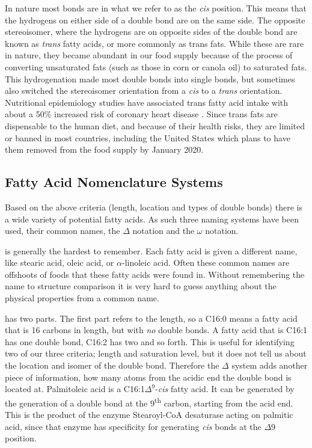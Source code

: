 \documentclass{tufte-handout}
\begin{document}
  In nature most bonds are in what we refer to as the \textit{cis} position.  This means that the hydrogens on either side of a double bond are on the same side.  The opposite stereoisomer, where the hydrogens are on opposite sides of the double bond are known as \textit{trans} fatty acids, or more commonly as trans fats.  While these are rare in nature, they became abundant in our food supply because of the process of converting unsaturated fats (such as those in corn or canola oil) to saturated fats.  This hydrogenation made most double bonds into single bonds, but sometimes also switched the stereoisomer orientation from a \textit{cis} to a \textit{trans} orientation.  Nutritional epidemiology studies have associated trans fatty acid intake with about a 50\% increased risk of coronary heart disease \citep{Willett1993,D.2006}.  Since trans fats are dispensable to the human diet, and because of their health risks, they are limited or banned in most countries, including the United States which plans to have them removed from the food supply by January 2020.  

\subsection{Fatty Acid Nomenclature Systems}

Based on the above criteria (length, location and types of double bonds) there is a wide variety of potential fatty acids.  As such three naming systems have been used, their common names, the $\Delta$ notation and the $\omega$ notation.  

 is generally the hardest to remember.  Each fatty acid is given a different name, like stearic acid, oleic acid, or $\alpha$-linoleic acid.  Often these common names are offshoots of foods that these fatty acids were found in.  Without remembering the name to structure comparison it is very hard to guess anything about the physical properties from a common name.

 has two parts.  The first part refers to the length, so a C16:0 means a fatty acid that is 16 carbons in length, but with \emph{no} double bonds.  A fatty acid that is C16:1 has one double bond, C16:2 has two and so forth.  This is useful for identifying two of our three criteria; length and saturation level, but it does not tell us about the location and isomer of the double bond.  Therefore the $\Delta$ system adds another piece of information, how many atoms from the acidic end the double bond is located at.  Palmitoleic acid is a C16:1$\Delta^9$-\textit{cis} fatty acid.  It can be generated by the generation of a double bond at the 9\textsuperscript{th} carbon, starting from the acid end.  This is the product of the enzyme Stearoyl-CoA desaturase acting on palmitic acid, since that enzyme has specificity for generating \textit{cis} bonds at the $\Delta$9 position.
\end{document}
